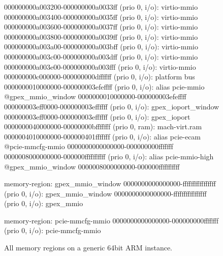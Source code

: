 \begin{figure} [ht]
\begin{ffcode}
        000000000a003200-000000000a0033ff (prio 0, i/o): virtio-mmio
        000000000a003400-000000000a0035ff (prio 0, i/o): virtio-mmio
        000000000a003600-000000000a0037ff (prio 0, i/o): virtio-mmio
        000000000a003800-000000000a0039ff (prio 0, i/o): virtio-mmio
        000000000a003a00-000000000a003bff (prio 0, i/o): virtio-mmio
        000000000a003c00-000000000a003dff (prio 0, i/o): virtio-mmio
        000000000a003e00-000000000a003fff (prio 0, i/o): virtio-mmio
        000000000c000000-000000000dffffff (prio 0, i/o): platform bus
        0000000010000000-000000003efeffff (prio 0, i/o): alias pcie-mmio @gpex_mmio_window 0000000010000000-000000003efeffff
        000000003eff0000-000000003effffff (prio 0, i/o): gpex_ioport_window
          000000003eff0000-000000003effffff (prio 0, i/o): gpex_ioport
        0000000040000000-00000000bfffffff (prio 0, ram): mach-virt.ram
        0000004010000000-000000401fffffff (prio 0, i/o): alias pcie-ecam @pcie-mmcfg-mmio 0000000000000000-000000000fffffff
        0000008000000000-000000ffffffffff (prio 0, i/o): alias pcie-mmio-high @gpex_mmio_window 0000008000000000-000000ffffffffff

    memory-region: gpex_mmio_window
      0000000000000000-ffffffffffffffff (prio 0, i/o): gpex_mmio_window
        0000000000000000-ffffffffffffffff (prio 0, i/o): gpex_mmio

    memory-region: pcie-mmcfg-mmio
      0000000000000000-000000000fffffff (prio 0, i/o): pcie-mmcfg-mmio
\end{ffcode}
\caption{All memory regions on a generic 64bit ARM instance.}
\label{fig:ARM_memory_full}
\end{figure}
